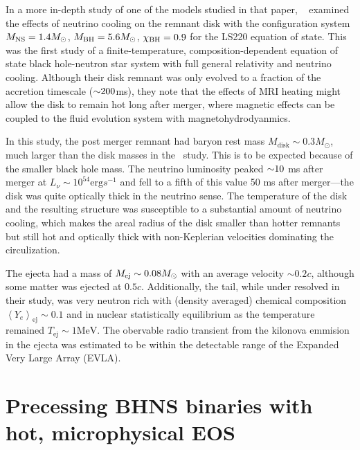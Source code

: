 In a more in-depth study of one of the models studied in that paper, ~\cite{Deaton2013} examined the effects of neutrino cooling on the remnant disk with the configuration system $M_{\rm NS} = 1.4 M_\odot$, $M_{\rm BH} = 5.6 M_\odot$, $\chi_{\rm BH} = 0.9$ for the LS220 equation of state.  
This was the first study of a finite-temperature, composition-dependent equation of state black hole-neutron star system with full general relativity and neutrino cooling.  
Although their disk remnant was only evolved to a fraction of the accretion timescale ($\mathord{\sim} 200$ms), they note that the effects of MRI heating might allow the disk to remain hot long after merger, where magnetic effects can be coupled to the fluid evolution system with magnetohydrodyanmics.


In this study, the post merger remnant had baryon rest mass $M_\textrm{disk} \sim 0.3 M_\odot$, much larger than the disk masses in the~\cite{Foucart:2014nda} study.  
This is to be expected because of the smaller black hole mass.
The neutrino luminosity peaked $\mathord{\sim} 10$ ms after merger at $L_\nu \sim 10^{54} \textrm{erg} s^{-1}$ and fell to a fifth of this value 50 ms after merger---the disk was quite optically thick in the neutrino sense.  The temperature of the disk and the resulting structure was susceptible to a substantial amount of neutrino cooling, which makes the areal radius of the disk smaller than hotter remnants but still hot and optically thick with non-Keplerian velocities dominating the circulization.

The ejecta had a mass of $M_{\rm ej} \sim 0.08 M_\odot$ with an average velocity $\sim 0.2 c$, although some matter was ejected at $0.5 c$. Additionally, the tail, while under resolved in their study, was very neutron rich with (density averaged) chemical composition $\left\langle Y_e \right\rangle_\textrm{ej} \sim 0.1$  and in nuclear statistically equilibrium as the temperature remained $T_\textrm{ej} \sim 1 \textrm{MeV}$.  The obervable radio transient from the kilonova emmision in the ejecta was estimated to be within the detectable range of the Expanded Very Large Array (EVLA).


\section{Precessing BHNS binaries with hot, microphysical EOS}

